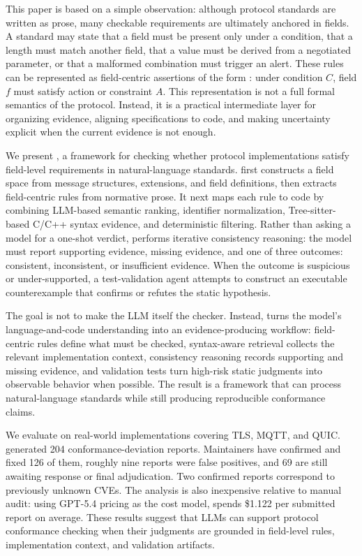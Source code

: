 This paper is based on a simple observation: although protocol standards are
written as prose, many checkable requirements are ultimately anchored in fields.
A standard may state that a field must be present only under a condition, that a
length must match another field, that a value must be derived from a negotiated
parameter, or that a malformed combination must trigger an alert. These rules
can be represented as field-centric assertions of the form : under
condition $C$, field $f$ must satisfy action or constraint $A$. This
representation is not a full formal semantics of the protocol. Instead, it is a
practical intermediate layer for organizing evidence, aligning specifications
to code, and making uncertainty explicit when the current evidence is not
enough.

We present \tool, a framework for checking whether protocol implementations
satisfy field-level requirements in natural-language standards. \tool first
constructs a field space from message structures, extensions, and field
definitions, then extracts field-centric rules from normative prose. It next
maps each rule to code by combining LLM-based semantic ranking, identifier
normalization, Tree-sitter-based C/C++ syntax evidence, and deterministic
filtering. Rather than asking a model for a one-shot verdict, \tool performs
iterative consistency reasoning: the model must report supporting evidence,
missing evidence, and one of three outcomes: consistent, inconsistent, or
insufficient evidence. When the outcome is suspicious or under-supported, a
test-validation agent attempts to construct an executable counterexample that
confirms or refutes the static hypothesis.

The goal is not to make the LLM itself the checker. Instead, \tool{} turns the
model's language-and-code understanding into an evidence-producing workflow:
field-centric rules define what must be checked, syntax-aware retrieval
collects the relevant implementation context, consistency reasoning records
supporting and missing evidence, and validation tests turn high-risk static
judgments into observable behavior when possible. The result is a framework
that can process natural-language standards while still producing reproducible
conformance claims.

We evaluate \tool on real-world implementations covering TLS, MQTT, and QUIC.
\tool generated 204 conformance-deviation reports.
Maintainers have confirmed and fixed 126 of them, roughly nine reports were
false positives, and 69 are still awaiting response or final adjudication. Two
confirmed reports correspond to previously unknown CVEs. The analysis is also
inexpensive relative to manual audit: using GPT-5.4 pricing as the cost model,
\tool spends \$1.122 per submitted report on average. These results suggest
that LLMs can support protocol conformance checking when their judgments are
grounded in field-level rules, implementation context, and validation
artifacts.

